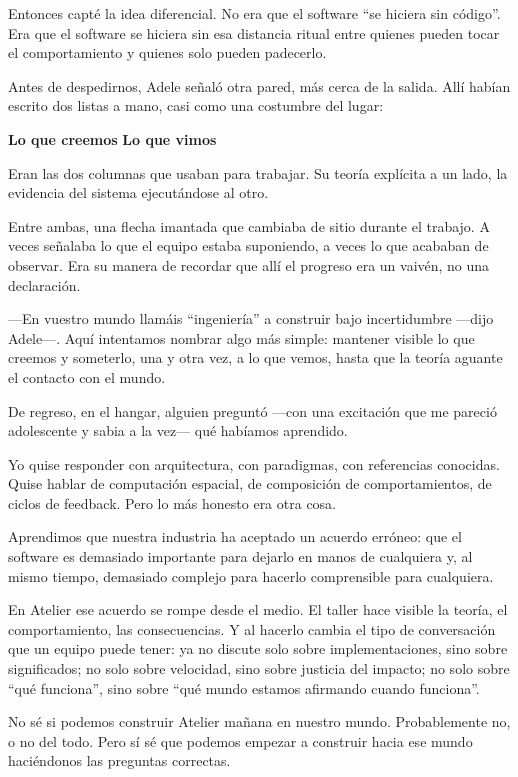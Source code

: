 \documentclass[11pt,a4paper]{article}
\begin{document}
Entonces capté la idea diferencial. No era que el software ``se hiciera sin
código''. Era que el software se hiciera sin esa distancia ritual entre
quienes pueden tocar el comportamiento y quienes solo pueden padecerlo.

Antes de despedirnos, Adele señaló otra pared, más cerca de la salida. Allí
habían escrito dos listas a mano, casi como una costumbre del lugar:

\begin{center}
\textbf{Lo que creemos} \hspace{3em} \textbf{Lo que vimos}
\end{center}

Eran las dos columnas que usaban para trabajar. Su teoría explícita a un lado,
la evidencia del sistema ejecutándose al otro.

Entre ambas, una flecha imantada que cambiaba de sitio durante el trabajo. A
veces señalaba lo que el equipo estaba suponiendo, a veces lo que acababan de
observar. Era su manera de recordar que allí el progreso era un vaivén, no una
declaración.

---En vuestro mundo llamáis ``ingeniería'' a construir bajo incertidumbre
---dijo Adele---. Aquí intentamos nombrar algo más simple: mantener visible lo
que creemos y someterlo, una y otra vez, a lo que vemos, hasta que la teoría
aguante el contacto con el mundo.

De regreso, en el hangar, alguien preguntó ---con una excitación que me
pareció adolescente y sabia a la vez--- qué habíamos aprendido.

Yo quise responder con arquitectura, con paradigmas, con referencias
conocidas. Quise hablar de computación espacial, de composición de
comportamientos, de ciclos de feedback. Pero lo más honesto era otra cosa.

Aprendimos que nuestra industria ha aceptado un acuerdo erróneo: que el
software es demasiado importante para dejarlo en manos de cualquiera y, al
mismo tiempo, demasiado complejo para hacerlo comprensible para cualquiera.

En Atelier ese acuerdo se rompe desde el medio. El taller hace visible la
teoría, el comportamiento, las consecuencias. Y al hacerlo cambia el tipo de
conversación que un equipo puede tener: ya no discute solo sobre
implementaciones, sino sobre significados; no solo sobre velocidad, sino sobre
justicia del impacto; no solo sobre ``qué funciona'', sino sobre ``qué mundo
estamos afirmando cuando funciona''.

No sé si podemos construir Atelier mañana en nuestro mundo. Probablemente no,
o no del todo. Pero sí sé que podemos empezar a construir hacia ese mundo
haciéndonos las preguntas correctas.
\end{document}
